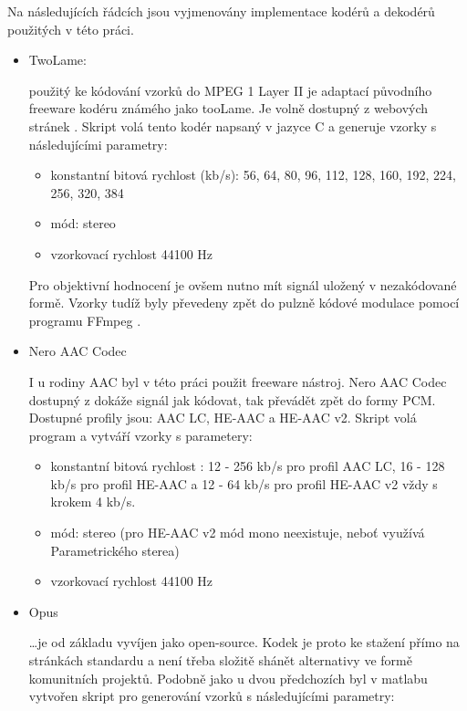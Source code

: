 Na následujících řádcích jsou vyjmenovány implementace kodérů a dekodérů použitých v této práci.
 
\begin{itemize}
    \item TwoLame:
    
použitý ke kódování vzorků do MPEG 1 Layer II je adaptací původního freeware kodéru známého jako tooLame. Je volně dostupný z webových stránek \cite{web:twolame}. Skript  volá tento kodér napsaný v jazyce C a generuje vzorky s následujícími parametry:

    \begin{itemize}
        \item konstantní bitová rychlost (kb/s): 56, 64, 80, 96, 112, 128, 160, 192, 224, 256, 320, 384
        \item mód: stereo
        \item vzorkovací rychlost 44100 Hz
    \end{itemize}
    Pro objektivní hodnocení je ovšem nutno mít signál uložený v nezakódované formě. Vzorky tudíž byly převedeny zpět do pulzně kódové modulace pomocí programu FFmpeg \cite{web:ffmpeg}.

    \item Nero AAC Codec
    
    I u rodiny AAC byl v této práci použit freeware nástroj. Nero AAC Codec dostupný z \cite{web:nero} dokáže signál jak kódovat, tak převádět zpět do formy PCM. Dostupné profily jsou: AAC LC, HE-AAC a HE-AAC v2.
    Skript  volá program  a vytváří vzorky s parametery:
        \begin{itemize}
        \item konstantní bitová rychlost : 12 - 256 kb/s pro profil AAC LC, 16 - 128 kb/s pro profil HE-AAC a 12 - 64 kb/s pro profil HE-AAC v2 vždy s krokem 4 kb/s.
        \item mód: stereo (pro HE-AAC v2 mód mono neexistuje, neboť využívá Parametrického sterea)
        \item vzorkovací rychlost 44100 Hz
    \end{itemize}

    \item Opus
    
    \dots je od základu vyvíjen jako open-source. Kodek je proto ke stažení přímo na stránkách standardu \cite{web:opus} a není třeba složitě shánět alternativy ve formě komunitních projektů. Podobně jako u dvou předchozích byl v matlabu vytvořen skript pro generování vzorků s následujícími parametry:
    

\end{itemize}
